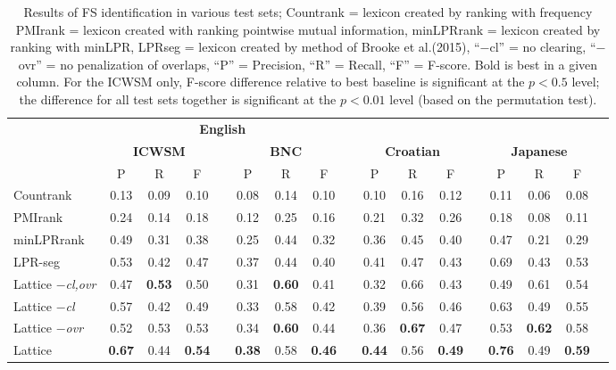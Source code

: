 \documentclass[11pt,letterpaper]{article}
\makeatletter
\def \al {al.\@ }
\makeatother
\begin{document}
 \begin{table}[!bt]
 
 \begin{center}
	 \setlength{\tabcolsep}{5.5pt}
\begin{tabular}{lcccccccccccccccc}

       \toprule
				& \multicolumn{7}{c}{\bf{English}} \\
       \cmidrule(lr){2-8}			
       & \multicolumn{3}{c}{\bf{ICWSM}} & &  \multicolumn{3}{c}{\bf{BNC}} & & \multicolumn{3}{c}{\bf{Croatian}}  && \multicolumn{3}{c}{\bf{Japanese}} \\
       \cmidrule(lr){2-4} \cmidrule(lr){6-8} \cmidrule(lr){10-12} \cmidrule(lr){14-16}
      & P & R & F &   & P & R & F &   & P & R & F &  & P & R & F \\
          \midrule 
Countrank & 0.13& 0.09 & 0.10 && 0.08 & 0.14 & 0.10 && 0.10 & 0.16 & 0.12 && 0.11 & 0.06 & 0.08 \\
PMIrank & 0.24& 0.14& 0.18 & & 0.12 & 0.25 & 0.16 & & 0.21 &0.32 & 0.26 & & 0.18& 0.08 & 0.11 \\ 
minLPRrank & 0.49& 0.31 & 0.38 & & 0.25& 0.44 & 0.32 & & 0.36 & 0.45 & 0.40 &  & 0.47 & 0.21 & 0.29 \\ 

LPR-seg  &0.53 & 0.42 & 0.47 && 0.37 & 0.44 & 0.40 & & 0.41 & 0.47  & 0.43 &  & 0.69 & 0.43 & 0.53 \\ 
  \midrule

	Lattice \emph{$-$cl,ovr} & 0.47& \bf{0.53} & 0.50 & & 0.31& \bf{0.60} & 0.41 & & 0.32 & 0.66 & 0.43 & & 0.49 & 0.61 & 0.54 \\ 

	Lattice \emph{$-$cl} & 0.57& 0.42 & 0.49 & & 0.33& 0.58 & 0.42 & & 0.39 & 0.56 & 0.46 & & 0.63 & 0.49 & 0.55 \\  	 
			
	Lattice \emph{$-$ovr} & 0.52& 0.53 & 0.53 & & 0.34& \bf{0.60} & 0.44& & 0.36 & \bf{0.67} & 0.47 & & 0.53 & \bf{0.62} & 0.58 \\  
			
				Lattice & \bf{0.67} & 0.44 & \bf{0.54} & & \bf{0.38}& 0.58 & \bf{0.46} & &\bf{0.44} & 0.56 & \bf{0.49} & & \bf{0.76} & 0.49 & \bf{0.59} \\ 
            \bottomrule

 \end{tabular}
 \caption{ Results of FS identification in various test sets; Countrank = lexicon created by ranking with frequency PMIrank = lexicon created with ranking pointwise mutual information, minLPRrank = lexicon created by ranking with minLPR, LPRseg = lexicon created by method of Brooke et \al (2015), ``$-$cl'' = no clearing, ``$-$ovr'' = no penalization of overlaps, ``P'' = Precision, ``R'' = Recall, ``F'' = F-score. Bold is best in a given column. For the ICWSM only, F-score difference relative to best baseline is significant at the $p < 0.5$ level; the difference for all test sets together is significant at the $ p < 0.01$ level (based on the permutation test).}
	 \label{tab:main}

 \end{center}


 \end{table}
\end{document}
